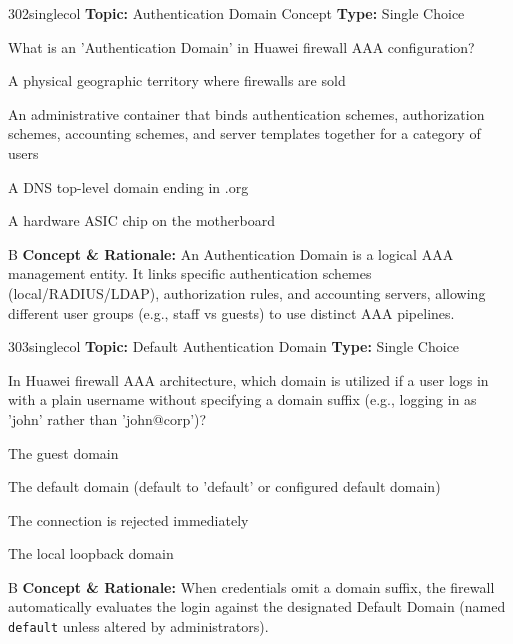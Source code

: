 \begin{qcard}{302}{singlecol}
\textcolor{darkslate!75}{\small\textbf{Topic:} Authentication Domain Concept \hfill \textbf{Type:} Single Choice}\vspace{0.4em}\par
What is an 'Authentication Domain' in Huawei firewall AAA configuration?
\begin{qoptions}
\item A physical geographic territory where firewalls are sold
\item An administrative container that binds authentication schemes, authorization schemes, accounting schemes, and server templates together for a category of users
\item A DNS top-level domain ending in .org
\item A hardware ASIC chip on the motherboard
\end{qoptions}
\end{qcard}
\nopagebreak
\begin{explainbox}{B}
\textbf{Concept \& Rationale:} An Authentication Domain is a logical AAA management entity. It links specific authentication schemes (local/RADIUS/LDAP), authorization rules, and accounting servers, allowing different user groups (e.g., staff vs guests) to use distinct AAA pipelines.
\end{explainbox}

\begin{qcard}{303}{singlecol}
\textcolor{darkslate!75}{\small\textbf{Topic:} Default Authentication Domain \hfill \textbf{Type:} Single Choice}\vspace{0.4em}\par
In Huawei firewall AAA architecture, which domain is utilized if a user logs in with a plain username without specifying a domain suffix (e.g., logging in as 'john' rather than 'john@corp')?
\begin{qoptions}
\item The guest domain
\item The default domain (default to 'default' or configured default domain)
\item The connection is rejected immediately
\item The local loopback domain
\end{qoptions}
\end{qcard}
\nopagebreak
\begin{explainbox}{B}
\textbf{Concept \& Rationale:} When credentials omit a domain suffix, the firewall automatically evaluates the login against the designated Default Domain (named \texttt{default} unless altered by administrators).
\end{explainbox}

